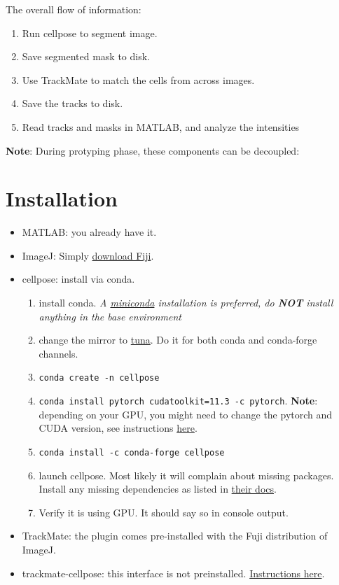 \documentclass[11pt]{article}
\begin{document}
The overall flow of information: 
\begin{enumerate}
\item Run cellpose to segment image.
\item Save segmented mask to disk.
\item Use TrackMate to match the cells from across images.
\item Save the tracks to disk.
\item Read tracks and masks in MATLAB, and analyze the intensities
\end{enumerate}
\textbf{Note}: During protyping phase, these components can be decoupled:

\section{Installation}
\label{sec:orgb2c228a}
\begin{itemize}
\item MATLAB: you already have it.
\item ImageJ: Simply \href{https://imagej.net/software/fiji/}{download Fiji}.
\item cellpose: install via conda. 
\begin{enumerate}
\item install conda. \emph{A \href{https://docs.conda.io/en/latest/miniconda.html}{miniconda} installation is preferred, do \textbf{NOT} install anything in the base environment}
\item change the mirror to \href{https://mirrors.tuna.tsinghua.edu.cn/help/anaconda/}{tuna}. Do it for both conda and conda-forge channels.
\item \texttt{conda create -n cellpose}
\item \texttt{conda install pytorch cudatoolkit=11.3 -c pytorch}. \textbf{Note}: depending on your GPU, you might need to change the pytorch and CUDA version, see instructions \href{https://github.com/MouseLand/cellpose/issues/481\#issuecomment-1080137885}{here}.
\item \texttt{conda install -c conda-forge cellpose}
\item launch cellpose. Most likely it will complain about missing packages. Install any missing dependencies as listed in \href{https://cellpose.readthedocs.io/en/latest/installation.html}{their docs}.
\item Verify it is using GPU. It should say so in console output.
\end{enumerate}
\item TrackMate: the plugin comes pre-installed with the Fuji distribution of ImageJ.
\item trackmate-cellpose: this interface is not preinstalled. \href{https://imagej.net/plugins/trackmate/trackmate-cellpose}{Instructions here}.
\end{itemize}
\end{document}
